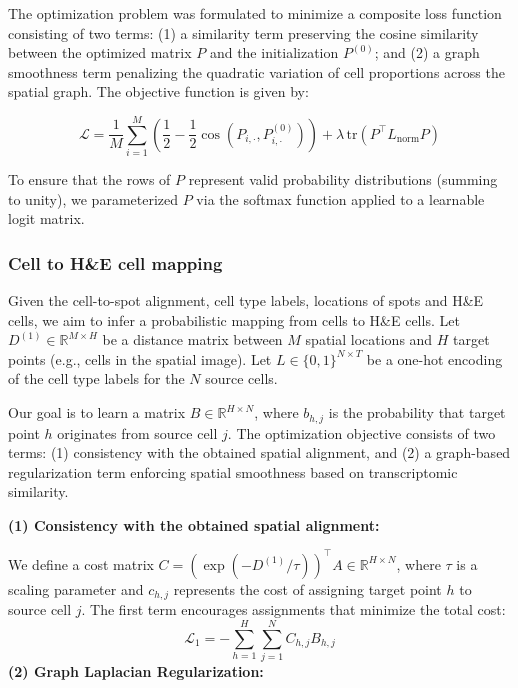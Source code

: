 \documentclass[10pt,a4paper]{article}
\begin{document}
The optimization problem was formulated to minimize a composite loss function consisting of two terms: (1) a similarity term preserving the cosine similarity between the optimized matrix $P$ and the initialization $P^{(0)}$; and (2) a graph smoothness term penalizing the quadratic variation of cell proportions across the spatial graph. The objective function is given by:

\begin{equation}
\mathcal{L} = \frac{1}{M} \sum_{i=1}^{M} \left( \frac{1}{2} - \frac{1}{2} \cos\left( P_{i,\cdot}, P_{i,\cdot}^{(0)} \right) \right) + \lambda \, \mathrm{tr}\left( P^{\top} L_{\mathrm{norm}} P \right)
\end{equation}

To ensure that the rows of $P$ represent valid probability distributions (summing to unity), we parameterized $P$ via the softmax function applied to a learnable logit matrix.

\subsubsection{Cell to H\&E cell mapping}

Given the cell-to-spot alignment, cell type labels, locations of spots and H\&E cells, we aim to infer a probabilistic mapping from cells to H\&E cells. Let $D^{(1)} \in \mathbb{R}^{M \times H}$ be a distance matrix between $M$ spatial locations and $H$ target points (e.g., cells in the spatial image). Let $L \in \{0,1\}^{N \times T}$ be a one-hot encoding of the cell type labels for the $N$ source cells.

Our goal is to learn a matrix $B \in \mathbb{R}^{H \times N}$, where $b_{h,j}$ is the probability that target point $h$ originates from source cell $j$. The optimization objective consists of two terms: (1) consistency with the obtained spatial alignment, and (2) a graph-based regularization term enforcing spatial smoothness based on transcriptomic similarity.

\textbf{(1) Consistency with the obtained spatial alignment:}

We define a cost matrix $C = \left( \exp(-D^{(1)}/\tau) \right)^{\top} A \in \mathbb{R}^{H \times N}$, where $\tau$ is a scaling parameter and $c_{h,j}$ represents the cost of assigning target point $h$ to source cell $j$. The first term encourages assignments that minimize the total cost:
\begin{equation}
\mathcal{L}_{1} = - \sum_{h=1}^{H} \sum_{j=1}^{N} C_{h,j} B_{h,j}
\end{equation}
\textbf{(2) Graph Laplacian Regularization:}
\end{document}
